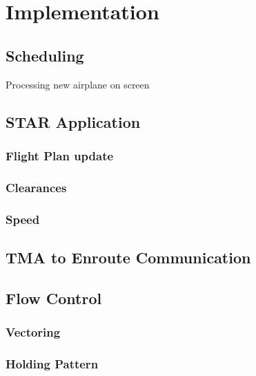 \chapter{Implementation}


\section{Scheduling}


\begin{algorithm}[H]
\begin{algorithmic}
\renewcommand{\algorithmicrequire}{\textbf{Input:}}
\renewcommand{\algorithmicensure}{\textbf{Output:}}

		\State \Return
	\EndIf
	\State {}
\EndFunction
\end{algorithmic}
\caption{Processing new airplane on screen}
\label{alg1}
\end{algorithm}

\section{STAR Application}
\subsection{Flight Plan update}
\subsection{Clearances}
\subsection{Speed}

\section{TMA to Enroute Communication}

\section{Flow Control}
\subsection{Vectoring}
\subsection{Holding Pattern}
